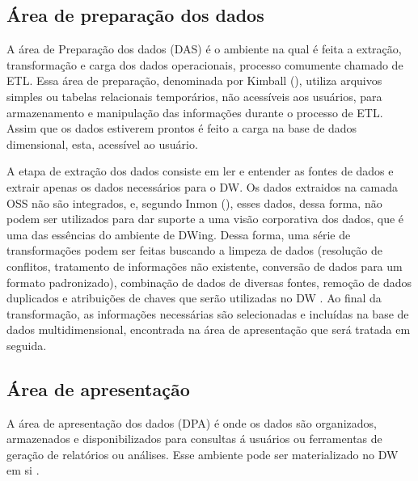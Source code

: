 \subsection{Área de preparação dos dados}

A área de Preparação dos dados (DAS) é o ambiente na qual é feita a extração, transformação e carga dos dados operacionais, processo comumente chamado de ETL. Essa área de preparação, denominada por Kimball (\citeyear{kimball2002}), utiliza arquivos simples ou tabelas relacionais temporários, não acessíveis aos usuários, para armazenamento e manipulação das informações durante o processo de ETL. Assim que os dados estiverem prontos é feito a carga na base de dados dimensional, esta, acessível ao usuário.

%

A etapa de extração dos dados consiste em ler e entender as fontes de dados e extrair apenas os dados necessários para o DW. Os dados extraidos na camada OSS não são integrados, e, segundo Inmon (\citeyear{inmon2002}), esses dados, dessa forma, não podem ser utilizados para dar suporte a uma visão corporativa dos dados, que é uma das essências do ambiente de DWing. Dessa forma, uma série de transformações podem ser feitas buscando a limpeza de dados (resolução de conflitos, tratamento de informações não existente, conversão de dados para um formato padronizado), combinação de dados de diversas fontes, remoção de dados duplicados e atribuições de chaves que serão utilizadas no DW \cite{kimball2002}. Ao final da transformação, as informações necessárias são selecionadas e incluídas na base de dados multidimensional, encontrada na área de apresentação que será tratada em seguida.

\subsection{Área de apresentação}

A área de apresentação dos dados (DPA) é onde os dados são organizados, armazenados e disponibilizados para consultas á usuários ou ferramentas de geração de relatórios ou análises. Esse ambiente pode ser materializado no DW em si \cite{kimball2002}. 

%

